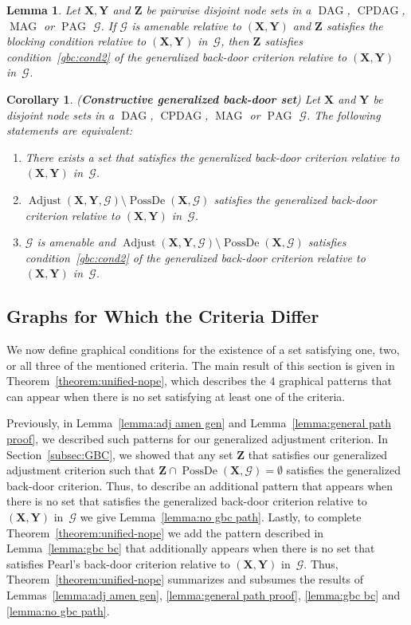 \documentclass[11pt,a4paper]{article}
\newtheorem{lemma}[definition]{Lemma}
\newtheorem{corollary}[definition]{Corollary}
\DeclareMathOperator{\CPDAG}{CPDAG}
\DeclareMathOperator{\DAG}{DAG}
\DeclareMathOperator{\MAG}{MAG}
\DeclareMathOperator{\PAG}{PAG}
\DeclareMathOperator{\PossDe}{PossDe}
\DeclareMathOperator{\Adjust}{Adjust}
\newcommand{\blck}{the blocking condition\xspace}
\newcommand{\g}[1][G]{\mathcal{#1}}
\newcommand{\adjustb}[2][X,Y]{\Adjust(\mathbf{#1},#2)}
\begin{document}
\begin{lemma}
Let $\mathbf{X,Y}$ and $\mathbf{Z}$ be pairwise disjoint node sets in a $\DAG$, $\CPDAG$, $\MAG$ or $\PAG$ $\g$. If $\g$ is amenable relative to $(\mathbf{X,Y})$ and $\mathbf{Z}$ satisfies \blck{} relative to $(\mathbf{X,Y})$ in~$\g$, then $\mathbf{Z}$ satisfies condition~\ref{gbc:cond2} of the generalized back-door criterion relative to $(\mathbf{X,Y})$ in~$\g$.
\label{lemma:adjust xy gbc cond 2}
\end{lemma}


\begin{corollary}(\textbf{Constructive generalized back-door set})
Let $\mathbf{X}$ and $\mathbf{Y}$ be disjoint node sets in a $\DAG$, $\CPDAG$, $\MAG$ or $\PAG$ $\g$.
The following statements are equivalent:
\begin{enumerate} [label = (\roman*)]
\item\label{constr-gbc-1} There exists a set that satisfies the generalized back-door criterion relative to $(\mathbf{X,Y})$ in~$\g$.
\item\label{constr-gbc-2} $\adjustb{\g}\setminus \PossDe(\mathbf{X},\g)$ satisfies the generalized back-door criterion relative to $(\mathbf{X,Y})$ in~$\g$.
\item\label{constr-gbc-3} $\g$ is amenable and $\adjustb{\g}\setminus \PossDe(\mathbf{X},\g)$ satisfies condition~\ref{gbc:cond2} of the  generalized back-door criterion relative to $(\mathbf{X,Y})$ in~$\g$.
\end{enumerate}
\label{cor:constr-set-gbc}
\end{corollary}


\subsection{Graphs for Which the Criteria Differ} \label{subsubsec:equivalence gac gbc}

We now define graphical conditions for the existence of a set satisfying one, two, or all three of the mentioned criteria. The main result of this section is given in Theorem~\ref{theorem:unified-nope}, which describes the $4$ graphical patterns that can appear when there is no set satisfying at least one of the criteria.

Previously, in Lemma~\ref{lemma:adj amen gen} and Lemma~\ref{lemma:general path proof}, we described such patterns for our generalized adjustment criterion.
In Section~\ref{subsec:GBC}, we showed that any set $\mathbf{Z}$ that satisfies our generalized adjustment criterion such that $\mathbf{Z} \cap \PossDe(\mathbf{X},\g) = \emptyset$ satisfies the generalized back-door criterion.
Thus, to describe an additional pattern that appears when there is no set that satisfies the generalized back-door criterion relative to $(\mathbf{X,Y})$ in~$\g$ we give Lemma~\ref{lemma:no gbc path}.
Lastly, to complete Theorem~\ref{theorem:unified-nope} we add the pattern described in Lemma~\ref{lemma:gbc bc} that additionally appears when there is no set that satisfies Pearl's back-door criterion relative to $(\mathbf{X,Y})$ in~$\g$.  
Thus, Theorem~\ref{theorem:unified-nope} summarizes and subsumes the results of Lemmas~\ref{lemma:adj amen gen}, \ref{lemma:general path proof}, \ref{lemma:gbc bc} and \ref{lemma:no gbc path}.
\end{document}
